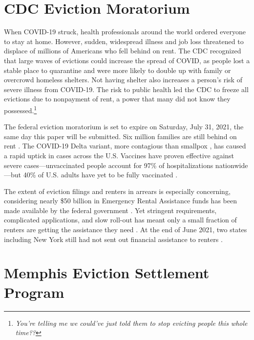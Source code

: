 \documentclass[
]{book}
\begin{document}
\hypertarget{cdc-eviction-moratorium}{%
\section{CDC Eviction Moratorium}\label{cdc-eviction-moratorium}}

When COVID-19 struck, health professionals around the world ordered everyone to stay at home. However, sudden, widespread illness and job loss threatened to displace of millions of Americans who fell behind on rent. The CDC recognized that large waves of evictions could increase the spread of COVID, as people lost a stable place to quarantine and were more likely to double up with family or overcrowd homeless shelters. \citep{cdc2020a} Not having shelter also increases a person's risk of severe illness from COVID-19. The risk to public health led the CDC to freeze all evictions due to nonpayment of rent, a power that many did not know they possessed.\footnote{\emph{You're telling me we could've just told them to stop evicting people this whole time??}}

The federal eviction moratorium is set to expire on Saturday, July 31, 2021, the same day this paper will be submitted. Six million families are still behind on rent \citep{sgaier2021}. The COVID-19 Delta variant, more contagious than smallpox \citep{anthes2021}, has caused a rapid uptick in cases across the U.S. Vaccines have proven effective against severe cases---unvaccinated people account for 97\% of hospitalizations nationwide \citep{mandavilli2021}---but 40\% of U.S. adults have yet to be fully vaccinated \citep{thenewyorktimes2020}.

The extent of eviction filings and renters in arrears is especially concerning, considering nearly \$50 billion in Emergency Rental Assistance funds has been made available by the federal government \citep{u.s.treasury2021}. Yet stringent requirements, complicated applications, and slow roll-out has meant only a small fraction of renters are getting the assistance they need \citep{deparle2021}. At the end of June 2021, two states including New York still had not sent out financial assistance to renters \citep{haag2021}.

\hypertarget{memphis-eviction-settlement-program}{%
\section{Memphis Eviction Settlement Program}\label{memphis-eviction-settlement-program}}
\end{document}
